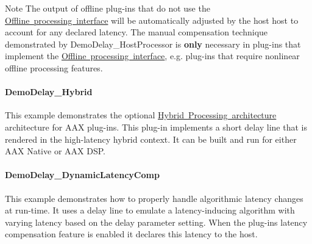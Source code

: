\begin{DoxyNote}{Note}
The output of offline plug-\/ins that do not use the \mbox{\hyperlink{a00804}{Offline processing interface}} will be automatically adjusted by the host host to account for any declared latency. The manual compensation technique demonstrated by Demo\+Delay\+\_\+\+Host\+Processor is {\bfseries{only}} necessary in plug-\/ins that implement the \mbox{\hyperlink{a00804}{Offline processing interface}}, e.\+g. plug-\/ins that require nonlinear offline processing features.
\end{DoxyNote}
\hypertarget{a00848_DemoDelay_Hybrid}{}\paragraph{Demo\+Delay\+\_\+\+Hybrid}\label{a00848_DemoDelay_Hybrid}
This example demonstrates the optional \mbox{\hyperlink{a00805}{Hybrid Processing architecture}} architecture for A\+AX plug-\/ins. This plug-\/in implements a short delay line that is rendered in the high-\/latency hybrid context. It can be built and run for either A\+AX Native or A\+AX D\+SP.\hypertarget{a00848_DemoDelay_DynamicLatencyComp}{}\paragraph{Demo\+Delay\+\_\+\+Dynamic\+Latency\+Comp}\label{a00848_DemoDelay_DynamicLatencyComp}
This example demonstrates how to properly handle algorithmic latency changes at run-\/time. It uses a delay line to emulate a latency-\/inducing algorithm with varying latency based on the delay parameter setting. When the plug-\/in\textquotesingle{}s latency compensation feature is enabled it declares this latency to the host.

